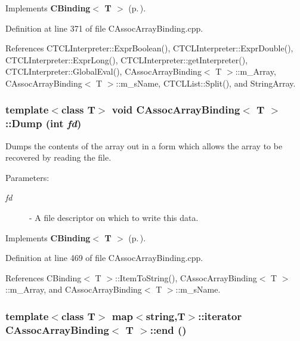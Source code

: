 Implements {\bf CBinding$<$ T $>$} {\rm (p.\,\pageref{classCBinding_a1})}.

Definition at line 371 of file CAssoc\-Array\-Binding.cpp.

References CTCLInterpreter::Expr\-Boolean(), CTCLInterpreter::Expr\-Double(), CTCLInterpreter::Expr\-Long(), CTCLInterpreter::get\-Interpreter(), CTCLInterpreter::Global\-Eval(), CAssoc\-Array\-Binding$<$ T $>$::m\_\-Array, CAssoc\-Array\-Binding$<$ T $>$::m\_\-s\-Name, CTCLList::Split(), and String\-Array.
\subsubsection{\setlength{\rightskip}{0pt plus 5cm}template$<$class T$>$ void CAssoc\-Array\-Binding$<$ T $>$::Dump (int {\em fd})\hspace{0.3cm}{\tt  [virtual]}}\label{classCAssocArrayBinding_a15}


Dumps the contents of the array out in a form which allows the array to be recovered by reading the file. \begin{Desc}
\item[Parameters: ]\par
\begin{description}
\item[{\em 
fd}]- A file descriptor on which to write this data. \end{description}
\end{Desc}


Implements {\bf CBinding$<$ T $>$} {\rm (p.\,\pageref{classCBinding_a2})}.

Definition at line 469 of file CAssoc\-Array\-Binding.cpp.

References CBinding$<$ T $>$::Item\-To\-String(), CAssoc\-Array\-Binding$<$ T $>$::m\_\-Array, and CAssoc\-Array\-Binding$<$ T $>$::m\_\-s\-Name.
\subsubsection{\setlength{\rightskip}{0pt plus 5cm}template$<$class T$>$ map$<$string,T$>$::iterator CAssoc\-Array\-Binding$<$ T $>$::end ()\hspace{0.3cm}{\tt  [inline]}}\label{classCAssocArrayBinding_a5}




